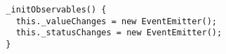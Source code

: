 \begin{verbatim}
  _initObservables() {
    this._valueChanges = new EventEmitter();
    this._statusChanges = new EventEmitter();
  }
\end{verbatim}
